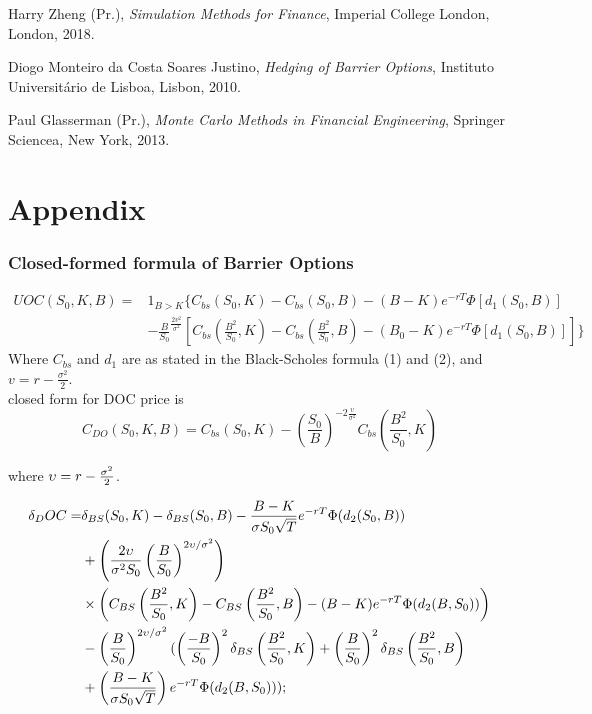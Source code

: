 \documentclass[11pt,a4paper,fleqn]{article}
\begin{document}
\begin{thebibliography}{9}

Harry Zheng (Pr.),
  \textit{Simulation Methods for Finance},
  Imperial College London, London,
  2018.

Diogo Monteiro da Costa Soares Justino,
  \textit{Hedging of Barrier Options},
  Instituto Universit\'ario de Lisboa, Lisbon,
  2010.

Paul Glasserman (Pr.),
  \textit{Monte Carlo Methods in Financial Engineering},
  Springer Sciencea, New York,
  2013.


\end{thebibliography}
\newpage

\part*{Appendix}
\appendix
\section{Closed-formed formula of Barrier Options}
\label{sec:bocomp}
\begin{equation}
\begin{aligned}
UOC(S_0,K,B) ={} &1_{B>K} \{ C_{bs}(S_0, K)-C_{bs}(S_0,B)-(B-K)e^{-rT}\Phi[d_{1}(S_0,B)] \\
      & -\frac{B}{S_0}^{\frac{2v^2}{\sigma^2}}\left[C_{bs}(\frac{B^2}{S_0}, K)-C_{bs}(\frac{B^2}{S_0}, B) -(B_0-K)e^{-rT}\Phi[d_{1}(S_0,B)]\right]\}
\end{aligned}
\end{equation}
Where $C_{bs}$ and $d_{1}$ are as stated in the Black-Scholes formula (1) and (2), and $v=r-\frac{\sigma^2}{2}$.\\

closed form for DOC price is
$$C_{DO}(S_0,K,B) = C_{bs}(S_0, K) -  (\frac{S_0}{B})^{ -2\frac{\upsilon}{\sigma^2}}C_{bs}(\frac{B^2}{S_0}, K)$$

where $\upsilon = r - {\sigma^2 \over 2}$.

\begin{align*}
\delta_DOC =& \delta_{BS}(S_0, K) - \delta_{BS}(S_0, B)-{B - K\over \sigma S_0 \sqrt{T}}e^{-rT}\Phi(d_2(S_0,B))\\
&+ \left({2\upsilon\over \sigma^2 S_0} \left({B \over S_0}\right)^{ 2\upsilon / \sigma^2} \right)\\
&\times \left(C_{BS}\left({B^2 \over S_0}, K\right) - C_{BS}\left({B^2\over S_0}, B\right) - (B - K)e^{-rT}\Phi(d_2(B, S_0))\right)\\
&-\left({B \over S_0}\right)^{ 2\upsilon / \sigma^2}(\left({-B \over S_0}\right)^2\delta_{BS}\left({B^2 \over S_0}, K\right) + \left({B\over S_0}\right)^2\delta_{BS}\left({B^2 \over S_0}, B\right)\\
&+ \left({B - K \over \sigma S_0\sqrt{T}}\right)e^{-rT}\Phi(d_2(B, S_0)));
\end{align*}
\end{document}
